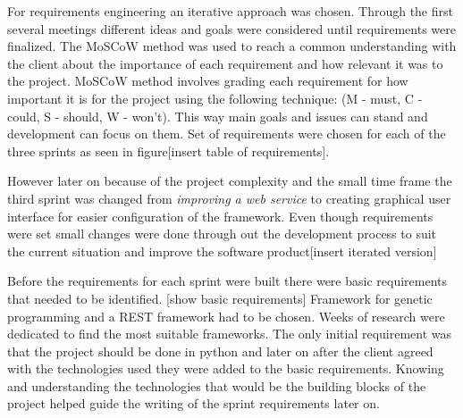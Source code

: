 For requirements engineering an iterative approach was chosen. Through the first several meetings
different ideas and goals were considered until requirements were finalized. The MoSCoW method was used to
reach a common understanding with the client about the importance of each requirement and how
relevant it was to the project. MoSCoW method involves grading each requirement for how important it is for the project using the following technique:
(M - must, C - could, S - should, W - won't). This way main goals and issues can stand and development can focus on them.
Set of requirements were chosen for each of the three sprints as seen in figure[insert table of requirements].

However later on because of the project complexity and the small time frame the third sprint was changed
from \textit{improving a web service} to creating graphical user interface for easier configuration of the 
framework. Even though requirements were set small changes were done through out the development process
to suit the current situation and improve the software product[insert iterated version]

Before the requirements for each sprint were built there were basic requirements that needed to be identified. [show basic requirements]
Framework for genetic programming and a REST framework had to be chosen. Weeks of research were dedicated to find the most suitable frameworks.
The only initial requirement was that the project should be done in python and later on after the client agreed with the technologies used they
were  added to the basic requirements. Knowing and understanding the technologies that would be the building blocks of the project helped guide 
the writing of the sprint requirements later on.

